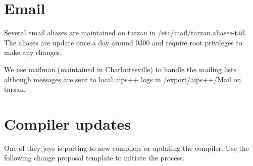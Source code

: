 \section{Email}
Several email aliases are maintained on tarzan in /etc/mail/tarzan.aliases-tail.
The aliases are update once a day around 0300 and require root privileges to 
make any changes.

We use mailman 
(maintained in Charlottesville) to handle the mailing lists although messages are
sent to local aips++ logs in /export/aips++/Mail on tarzan.

\section{Compiler updates}
One of they joys is porting to new compilers or updating the compiler.  Use the following
change proposal template to initiate the process.

